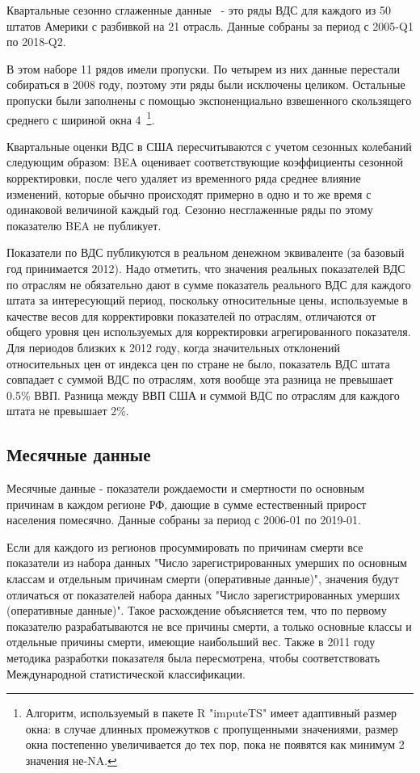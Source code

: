 \documentclass[12pt,a4paper, oneside]{extreport}
\begin{document}
Квартальные сезонно сглаженные данные~ - это ряды ВДС  для каждого из 50 штатов Америки с разбивкой на 21 отрасль.  Данные собраны за период с 2005-Q1 по 2018-Q2. 


В этом наборе 11 рядов имели пропуски. По четырем из них  данные перестали собираться в 2008 году, поэтому эти ряды были исключены целиком. Остальные пропуски  были заполнены с помощью экспоненциально взвешенного скользящего среднего с шириной окна 4~\footnote{Алгоритм, используемый в пакете R "imputeTS" имеет адаптивный размер окна: в случае длинных промежутков с пропущенными значениями, размер окна постепенно увеличивается до тех пор, пока не появятся как минимум 2 значения не-NA. }. 

Квартальные оценки ВДС в США пересчитываются с учетом сезонных колебаний следующим образом: BEA оценивает соответствующие коэффициенты сезонной корректировки, после чего удаляет из временного ряда среднее влияние изменений, которые обычно происходят примерно в одно и то же время  с одинаковой величиной каждый год. Сезонно несглаженные ряды по этому показателю BEA не публикует.

Показатели по ВДС публикуются в реальном денежном эквиваленте (за базовый год принимается 2012).
Надо отметить, что  значения реальных показателей ВДС по отраслям не обязательно дают в сумме показатель реального ВДС для каждого штата за интересующий период, поскольку относительные цены, используемые в качестве весов для корректировки показателей по отраслям, отличаются от общего уровня цен используемых для корректировки агрегированного показателя. 
Для периодов близких к 2012 году, когда значительных отклонений относительных цен от индекса цен по стране не было, показатель ВДС штата совпадает с суммой ВДС по отраслям, хотя  вообще эта разница не превышает 0.5\% ВВП.
Разница между ВВП США и суммой ВДС по отраслям для каждого штата не превышает 2\%. 


\subsection{Месячные данные}

Месячные данные - показатели рождаемости и смертности по основным причинам  в каждом регионе РФ, дающие в сумме естественный прирост населения помесячно. 
Данные собраны за период с 2006-01 по 2019-01. 


Если для каждого из регионов просуммировать по причинам смерти все показатели из набора данных "Число зарегистрированных умерших по основным классам и отдельным причинам смерти (оперативные данные)", значения будут отличаться от показателей набора данных "Число зарегистрированных умерших (оперативные данные)". Такое расхождение объясняется тем, что по первому показателю  разрабатываются не все причины смерти, а только основные классы и отдельные причины смерти, имеющие наибольший вес. Также в 2011 году методика разработки показателя была пересмотрена, чтобы соответствовать  Международной статистической классификации. 
\end{document}
